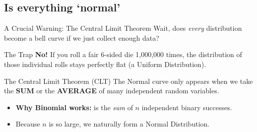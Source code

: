 \subsection{Is everything \lq normal\rq\ }
\begin{frame}{A Crucial Warning: The Central Limit Theorem}
    Wait, does \textit{every} distribution become a bell curve if we just collect enough data?
    
    \vspace{0.2cm}
    \begin{alertblock}{The Trap}
        \textbf{No!} If you roll a fair 6-sided die 1,000,000 times, the distribution of those individual rolls stays perfectly flat (a Uniform Distribution).
    \end{alertblock}

    \pause
    \vspace{0.2cm}
    \begin{block}{The Central Limit Theorem (CLT)}
        The Normal curve only appears when we take the \textbf{SUM} or the \textbf{AVERAGE} of many independent random variables.
        
        \begin{itemize}
            \item \textbf{Why Binomial works:} is the \textit{sum} of $n$ independent binary successes. 
            \item Because $n$ is so large, we naturally form a Normal Distribution.
        \end{itemize}
    \end{block}
\end{frame}

